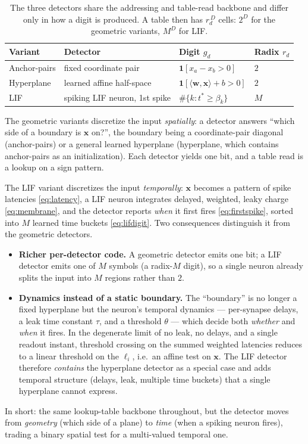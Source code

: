 \documentclass[11pt]{article}
\newcommand{\x}{\mathbf{x}}
\newcommand{\w}{\mathbf{w}}
\newcommand{\ind}[1]{\mathbf{1}\!\left[#1\right]}
\begin{document}
\begin{table}[h]
  \centering
  \begin{tabular}{@{}llll@{}}
    \toprule
    Variant & Detector & Digit $g_d$ & Radix $r_d$ \\
    \midrule
    Anchor-pairs & fixed coordinate pair        & $\ind{x_a - x_b > 0}$             & $2$ \\
    Hyperplane   & learned affine half-space    & $\ind{\langle\w,\x\rangle + b > 0}$ & $2$ \\
    LIF          & spiking LIF neuron, 1st spike & $\#\{k : t^{\ast} \ge \beta_k\}$  & $M$ \\
    \bottomrule
  \end{tabular}
  \caption{The three detectors share the addressing and table-read backbone and differ only in how a digit is
  produced. A table then has $r_d^{\,D}$ cells: $2^{D}$ for the geometric variants, $M^{D}$ for LIF.}
  \label{tab:variants}
\end{table}

The geometric variants discretize the input \emph{spatially}: a detector answers ``which side of a boundary is
$\x$ on?'', the boundary being a coordinate-pair diagonal (anchor-pairs) or a general learned hyperplane
(hyperplane, which contains anchor-pairs as an initialization). Each detector yields one bit, and a table read
is a lookup on a sign pattern.

The LIF variant discretizes the input \emph{temporally}: $\x$ becomes a pattern of spike latencies
\eqref{eq:latency}, a LIF neuron integrates delayed, weighted, leaky charge \eqref{eq:membrane}, and the
detector reports \emph{when} it first fires \eqref{eq:firstspike}, sorted into $M$ learned time buckets
\eqref{eq:lifdigit}. Two consequences distinguish it from the geometric detectors.
\begin{itemize}
  \item \textbf{Richer per-detector code.} A geometric detector emits one bit; a LIF detector emits one of $M$
    symbols (a radix-$M$ digit), so a single neuron already splits the input into $M$ regions rather than $2$.
  \item \textbf{Dynamics instead of a static boundary.} The ``boundary'' is no longer a fixed hyperplane but
    the neuron's temporal dynamics --- per-synapse delays, a leak time constant $\tau$, and a threshold
    $\theta$ --- which decide both \emph{whether} and \emph{when} it fires. In the degenerate limit of no
    leak, no delays, and a single readout instant, threshold crossing on the summed weighted latencies reduces
    to a linear threshold on the $\ell_i$, i.e.\ an affine test on $\x$. The LIF detector therefore
    \emph{contains} the hyperplane detector as a special case and adds temporal structure (delays, leak,
    multiple time buckets) that a single hyperplane cannot express.
\end{itemize}

In short: the same lookup-table backbone throughout, but the detector moves from \emph{geometry} (which side
of a plane) to \emph{time} (when a spiking neuron fires), trading a binary spatial test for a multi-valued
temporal one.
\end{document}

